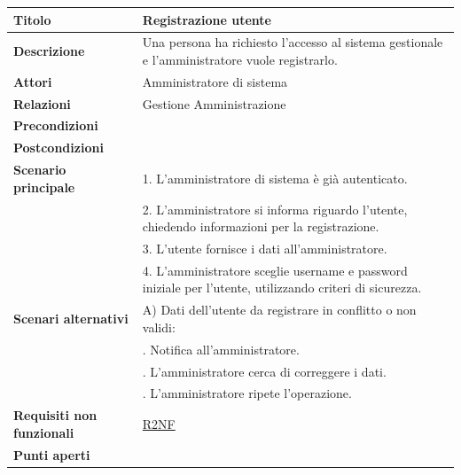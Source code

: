 \documentclass[a4paper]{article}
\begin{document}
\begin{center}
\begin{tabularx}{1\textwidth}{|l|X|}
    \hline
	\textbf{Titolo} & Registrazione utente \\
	\hline
	\textbf{Descrizione} & Una persona ha richiesto l'accesso al sistema gestionale e l'amministratore vuole registrarlo. \\
	\hline
	\textbf{Attori} & Amministratore di sistema \\
	\hline
	\textbf{Relazioni} & Gestione Amministrazione \\
	\hline
	\textbf{Precondizioni} &  \\
	\hline
	\textbf{Postcondizioni} &  \\
	\hline
	\textbf{Scenario principale} & 1. L'amministratore di sistema è già autenticato.\\
	                             & 2. L'amministratore si informa riguardo l'utente, chiedendo informazioni per la registrazione.\\
								 & 3. L'utente fornisce i dati all'amministratore.\\
								 & 4. L'amministratore sceglie username e password iniziale per l'utente, utilizzando criteri di sicurezza.\\
	\hline
	\textbf{Scenari alternativi} & A) Dati dell'utente da registrare in conflitto o non validi: \\
								 & \quad 1. Notifica all'amministratore.\\
								 & \quad 2. L'amministratore cerca di correggere i dati.\\
								 & \quad 3. L'amministratore ripete l'operazione.\\
	\hline
	\textbf{Requisiti non funzionali} & \hyperlink{R2NF}{R2NF} \\
	\hline
	\textbf{Punti aperti} & \\
	\hline
\end{tabularx}
\end{center}




\end{document}
